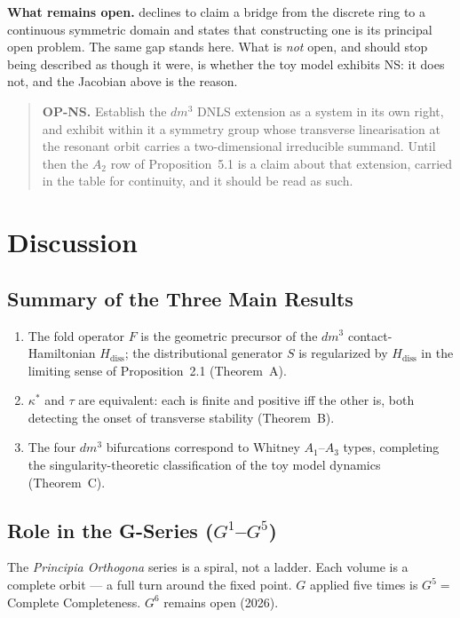 \documentclass[11pt]{article}
\theoremstyle{boxed}
\begin{document}
\smallskip
\noindent\textbf{What remains open.} \cite{wp77} declines to claim a bridge from the discrete ring to
a continuous symmetric domain and states that constructing one is its principal open problem. The
same gap stands here. What is \emph{not} open, and should stop being described as though it were, is
whether the toy model exhibits NS: it does not, and the Jacobian above is the reason.

\begin{quote}
\textbf{OP-NS.} Establish the $dm^3$ DNLS extension as a system in its own right, and exhibit within
it a symmetry group whose transverse linearisation at the resonant orbit carries a two-dimensional
irreducible summand. Until then the $A_2$ row of Proposition~5.1 is a claim about that extension,
carried in the table for continuity, and it should be read as such.
\end{quote}

\section{Discussion}

\subsection{Summary of the Three Main Results}

\begin{enumerate}
  \item The fold operator $F$ is the geometric precursor of the $dm^3$ contact-Hamiltonian
        $H_{\mathrm{diss}}$; the distributional generator $S$ is regularized by
        $H_{\mathrm{diss}}$ in the limiting sense of Proposition~2.1 (Theorem~A).
  \item $\kappa^{*}$ and $\tau$ are equivalent: each is finite and positive iff the
        other is, both detecting the onset of transverse stability (Theorem~B).
  \item The four $dm^3$ bifurcations correspond to Whitney $A_1$--$A_3$ types,
        completing the singularity-theoretic classification of the toy model dynamics
        (Theorem~C).
\end{enumerate}

\subsection{Role in the G-Series ($G^1$--$G^5$)}

The \emph{Principia Orthogona} series is a spiral, not a ladder. Each volume is a
complete orbit --- a full turn around the fixed point. $G$ applied five times is
$G^5 = $ Complete Completeness. $G^6$ remains open (2026).
\end{document}
